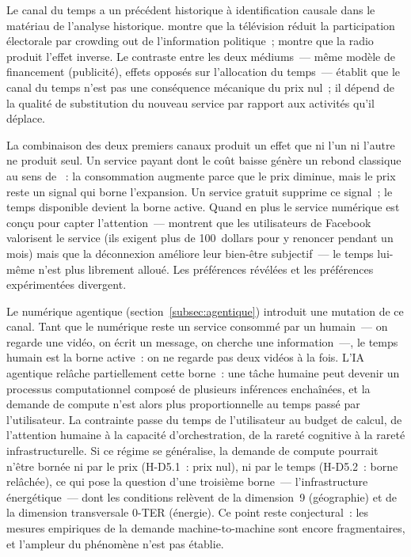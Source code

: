 Le canal du temps a un précédent historique à identification causale dans le matériau de l'analyse historique. \textcite{gentzkow_television_2006} montre que la télévision réduit la participation électorale par crowding out de l'information politique~; \textcite{stromberg_radio_2004} montre que la radio produit l'effet inverse. Le contraste entre les deux médiums~--- même modèle de financement (publicité), effets opposés sur l'allocation du temps~--- établit que le canal du temps n'est pas une conséquence mécanique du prix nul~; il dépend de la qualité de substitution du nouveau service par rapport aux activités qu'il déplace.

La combinaison des deux premiers canaux produit un effet que ni l'un ni l'autre ne produit seul. Un service payant dont le coût baisse génère un rebond classique au sens de \textcite{jevons_coal_1865}~: la consommation augmente parce que le prix diminue, mais le prix reste un signal qui borne l'expansion. Un service gratuit supprime ce signal~; le temps disponible devient la borne active. Quand en plus le service numérique est conçu pour capter l'attention~--- \textcite{allcott_welfare_2020} montrent que les utilisateurs de Facebook valorisent le service (ils exigent plus de 100~dollars pour y renoncer pendant un mois) mais que la déconnexion améliore leur bien-être subjectif~--- le temps lui-même n'est plus librement alloué. Les préférences révélées et les préférences expérimentées divergent.

Le numérique agentique (section~\ref{subsec:agentique}) introduit une mutation de ce canal. Tant que le numérique reste un service consommé par un humain~--- on regarde une vidéo, on écrit un message, on cherche une information~---, le temps humain est la borne active~: on ne regarde pas deux vidéos à la fois. L'IA agentique relâche partiellement cette borne~: une tâche humaine peut devenir un processus computationnel composé de plusieurs inférences enchaînées, et la demande de compute n'est alors plus proportionnelle au temps passé par l'utilisateur. La contrainte passe du temps de l'utilisateur au budget de calcul, de l'attention humaine à la capacité d'orchestration, de la rareté cognitive à la rareté infrastructurelle. Si ce régime se généralise, la demande de compute pourrait n'être bornée ni par le prix (H-D5.1~: prix nul), ni par le temps (H-D5.2~: borne relâchée), ce qui pose la question d'une troisième borne~--- l'infrastructure énergétique~--- dont les conditions relèvent de la dimension~9 (géographie) et de la dimension transversale 0-TER (énergie). Ce point reste conjectural~: les mesures empiriques de la demande machine-to-machine sont encore fragmentaires, et l'ampleur du phénomène n'est pas établie.

